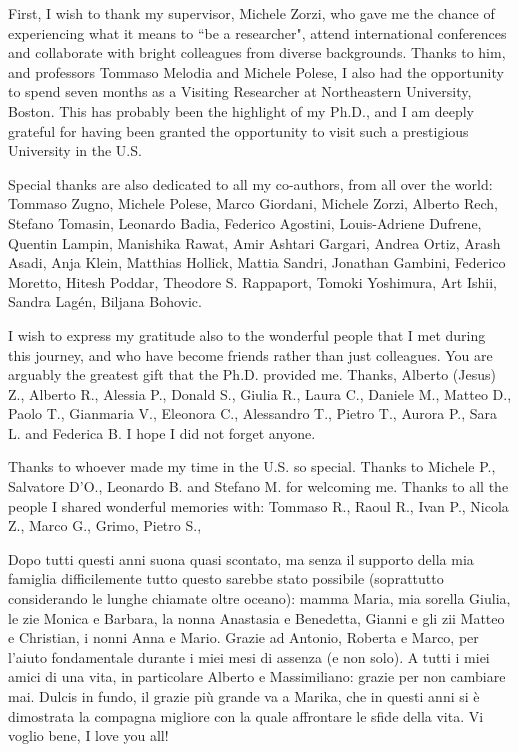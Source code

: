 \small

First, I wish to thank my supervisor, Michele Zorzi, who gave me the chance of experiencing what it means to ``be a researcher", attend international conferences and collaborate with bright colleagues from diverse backgrounds.
Thanks to him, and professors Tommaso Melodia and Michele Polese, I also had the opportunity to spend seven
months as a Visiting Researcher at Northeastern University, Boston. This has probably been the highlight of my Ph.D., and I am deeply grateful for having been granted the opportunity to visit such a prestigious University in the U.S.

Special thanks are also dedicated to all my co-authors, from all over the world:
Tommaso Zugno, Michele Polese, Marco Giordani, Michele Zorzi,
Alberto Rech, Stefano Tomasin, Leonardo Badia, Federico Agostini, Louis-Adriene Dufrene, Quentin Lampin, Manishika Rawat,
Amir Ashtari Gargari, Andrea Ortiz, Arash Asadi, Anja Klein, Matthias Hollick,
Mattia Sandri,
Jonathan Gambini, Federico Moretto,
Hitesh Poddar, Theodore S. Rappaport, Tomoki Yoshimura, Art Ishii,
Sandra Lagén, Biljana Bohovic.

I wish to express my gratitude also to the wonderful people that I met during this journey, and who have become friends rather than just colleagues.
You are arguably the greatest gift that the Ph.D. provided me. 
Thanks, Alberto (Jesus) Z., Alberto R., Alessia P., Donald S., Giulia R., Laura C., Daniele M., Matteo D., Paolo T., Gianmaria V., Eleonora C., Alessandro T., Pietro T., Aurora P., Sara L. and Federica B.
I hope I did not forget anyone.

Thanks to whoever made my time in the U.S. so special. Thanks to Michele P., Salvatore D'O., Leonardo B. and Stefano M. for welcoming me.
Thanks to all the people I shared wonderful memories with: Tommaso R., Raoul R., Ivan P., Nicola Z., Marco G., Grimo, Pietro S., 

Dopo tutti questi anni suona quasi scontato, ma senza il supporto della mia famiglia diﬀicilemente tutto
questo sarebbe stato possibile (soprattutto considerando le lunghe chiamate oltre oceano): mamma Maria, mia
sorella Giulia, le zie Monica e Barbara, la nonna Anastasia e Benedetta, Gianni e gli zii Matteo e Christian,
i nonni Anna e Mario. Grazie ad Antonio, Roberta e Marco, per l’aiuto fondamentale durante i miei mesi di
assenza (e non solo). A tutti i miei amici di una vita, in particolare Alberto e Massimiliano: grazie per non
cambiare mai.
Dulcis in fundo, il grazie più grande va a Marika, che in questi anni si è dimostrata la compagna migliore
con la quale affrontare le sfide della vita.
Vi voglio bene, I love you all!